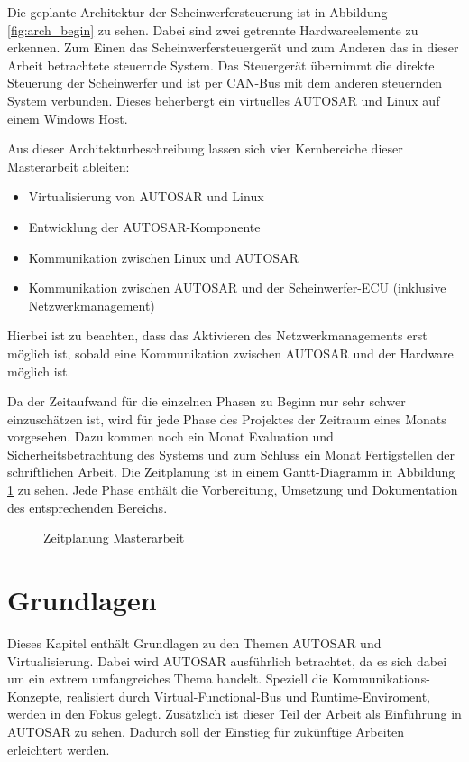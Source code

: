 \documentclass[
  a4paper,					    %
  twoside,
  DIV=calc,     				%
  bibliography=totoc,
  cleardoublepage=empty,
  ngerman,     					%
  final       					%
]{scrbook}
\begin{document}
Die geplante Architektur der Scheinwerfersteuerung ist in Abbildung \ref{fig:arch_begin} zu sehen. Dabei sind zwei getrennte Hardwareelemente zu erkennen. Zum Einen das Scheinwerfersteuergerät und zum Anderen das in dieser Arbeit betrachtete steuernde System. Das Steuergerät übernimmt die direkte Steuerung der Scheinwerfer und ist per CAN-Bus mit dem anderen steuernden System verbunden.  Dieses beherbergt ein virtuelles AUTOSAR und Linux auf einem Windows Host.

Aus dieser Architekturbeschreibung lassen sich vier Kernbereiche dieser Masterarbeit ableiten:

\begin{itemize}
    \item Virtualisierung von AUTOSAR und Linux
    \item Entwicklung der AUTOSAR-Komponente
    \item Kommunikation zwischen Linux und AUTOSAR
    \item Kommunikation zwischen AUTOSAR und der Scheinwerfer-ECU (inklusive Netzwerkmanagement)
\end{itemize}

Hierbei ist zu beachten, dass das Aktivieren des Netzwerkmanagements erst möglich ist, sobald eine Kommunikation zwischen AUTOSAR und der Hardware möglich ist.

Da der Zeitaufwand für die einzelnen Phasen zu Beginn nur sehr schwer einzuschätzen ist, wird für jede Phase des Projektes der Zeitraum eines Monats vorgesehen. Dazu kommen noch ein Monat Evaluation und Sicherheitsbetrachtung des Systems und zum Schluss ein Monat Fertigstellen der schriftlichen Arbeit. Die Zeitplanung ist in einem Gantt-Diagramm in Abbildung \ref{fig:gantt} zu sehen. Jede Phase enthält die Vorbereitung, Umsetzung und Dokumentation des entsprechenden Bereichs.

\begin{figure}[ht]
    \centering
    
    \caption{Zeitplanung Masterarbeit}
    \label{fig:gantt}
\end{figure}


\chapter{Grundlagen}
\label{sec:Grundlagen}
Dieses Kapitel enthält Grundlagen zu den Themen AUTOSAR und Virtualisierung. Dabei wird AUTOSAR ausführlich betrachtet, da es sich dabei um ein extrem umfangreiches Thema handelt. Speziell die Kommunikations-Konzepte, realisiert durch Virtual-Functional-Bus und Runtime-Enviroment, werden in den Fokus gelegt. Zusätzlich ist dieser Teil der Arbeit als Einführung in AUTOSAR zu sehen. Dadurch soll der Einstieg für zukünftige Arbeiten erleichtert werden.
\end{document}
